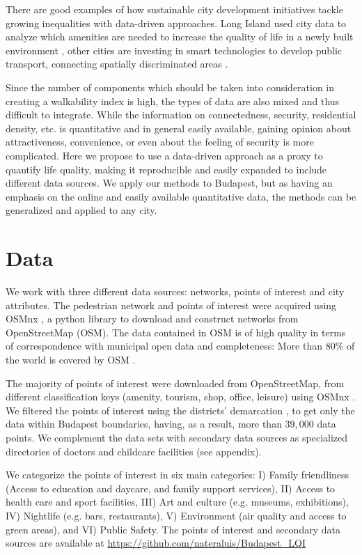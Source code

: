 There are good examples of how sustainable city development initiatives tackle growing inequalities with data-driven approaches. Long Island used city data to analyze which amenities are needed to increase the quality of life in a newly built environment \cite{LongIsland}, other cities are investing in smart technologies to develop public transport, connecting spatially discriminated areas \cite{NYC,Amsterdam}.

Since the number of components which should be taken into consideration in creating a walkability index is high, the types of data are also mixed and thus difficult to integrate. While the information on connectedness, security, residential density, etc. is quantitative and in general easily available, gaining opinion about attractiveness, convenience, or even about the feeling of security is more complicated. Here we propose to use a data-driven approach as a proxy to quantify life quality, making it reproducible and easily expanded to include different data sources. We apply our methods to Budapest, but as having an emphasis on the online and easily available quantitative data, the methods can be generalized and applied to any city.

\section{Data}
We work with three different data sources: networks, points of interest and city attributes. The pedestrian network and points of interest were acquired using OSMnx \cite{Boeing2017a}, a python library to download and construct networks from OpenStreetMap (OSM). The data contained in OSM is of high quality \cite{Haklay2010b,Girres2010} in terms of correspondence with municipal open data \cite{Ferster2019} and completeness: More than $80\%$ of the world is covered by OSM \cite{Barbosa-Filho2017}.

The majority of points of interest were downloaded from OpenStreetMap, from different classification keys (amenity, tourism, shop, office, leisure) using OSMnx \cite{Boeing2017a}. We filtered the points of interest using the districts' demarcation \cite{hu_dist}, to get only the data within Budapest boundaries, having, as a result, more than $39,000$ data points. We complement the data sets with secondary data sources as specialized directories of doctors and childcare facilities (see appendix).

We categorize the points of interest in six main categories: I) Family friendliness (Access to education and daycare, and family support services), II) Access to health care and sport facilities, III) Art and culture (e.g. museums, exhibitions), IV) Nightlife (e.g. bars, restaurants), V) Environment (air quality and access to green areas), and VI) Public Safety. The points of interest and secondary data sources are available at \url{https://github.com/nateraluis/Budapest_LQI}

